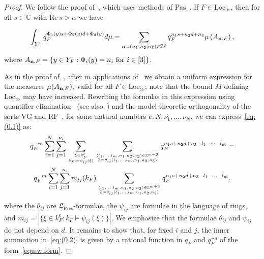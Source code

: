\documentclass[11pt,a4paper]{amsart}
\theoremstyle{plain}
\theoremstyle{remark}
\newcommand{\Z}{\mathbb{Z}}
\def \bfn {{\bf n}}
\begin{document}
\begin{proof}
We follow the proof of~\cite[Theorem~B]{BDOP/11}, which uses methods
of Pas~\cite{Pas/89}. If $F\in\mathrm{Loc}_{\gg}$, then for all $s\in\mathbb{C}$
with $\mathrm{Re} \, s> \alpha$ we have

\begin{equation} \label{eq:(0.1)}
\int_{Y_{F}}q_{F}^{\Phi_{1}(y)s+\Phi_{2}(y)d+\Phi_{3}(y)}d\mu=\sum_{\bfn = (n_{1},n_{2},n_{3}) \in \mathbb{Z}^{3}} q_{F}^{n_{1}s+n_{2}d+n_{3}}\mu\left(A_{\bfn,F}\right),
\end{equation}
where 
$A_{\bfn,F}=\{y \in Y_{F}:\Phi_{i}(y)=n_{i}\text{ for }i \in [3] \}$.

As in the proof of~\cite[Theorem~B]{BDOP/11}, after $m$ applications
of~\cite[Theorem~4.1]{BDOP/11} we obtain a uniform expression for
the measures $\mu(A_{\bfn,F})$, valid for all $F\in\mathrm{Loc}_{\gg}$; note that the bound $M$ defining $\mathrm{Loc}_\gg$ may have increased.
Rewriting the formulas in this expression using quantifier elimination~\cite[Theorem~4.1]{Pas/89} (see also~\cite[Theorem~3.7]{BDOP/11})
and the model-theoretic orthogonality of the sorts $\mathrm{VG}$
and $\mathrm{RF}$~\cite[Lemma 5.3]{Pas/89},
for some natural numbers $e,N,\nu_{1},...,\nu_{N}$, we can express~\eqref{eq:(0.1)}
as:
\begin{multline} \label{eq:(0.2)}
q_F^{-m} \sum_{i = 1}^N \sum_{j = 1}^{\nu_i} \sum_{\xi \in k_F^e \atop k_F \models \psi_{ij}(\xi)} \sum_{(l_1, \dots, l_m, n_1, n_2, n_3) \in \Z^{m+3} \atop \Z \models \theta_{ij}(l_1, \dots, l_m, n_1, n_2, n_3)} q_F^{n_1 s + n_2 d + n_3 - l_1 - \cdots - l_m} = \\
q_{F}^{-m}\sum_{i=1}^{N}\sum_{j=1}^{\nu_{i}}m_{ij}(k_{F})\sum_{
(l_{1},...,l_{m},n_{1},n_{2},n_{3}) \in\mathbb{Z}^{m+3} \atop
\mathbb{Z}\models\theta_{ij}(l_{1},...,l_{m},n_{1},n_{2},n_{3})
}q_{F}^{n_{1}s+n_{2}d+n_{3}-l_{1}-...-l_{m}},
\end{multline}
where the $\theta_{ij}$ are $\mathfrak{L}_{\mathrm{Pres}}$-formulae, the $\psi_{ij}$ are formulae in the language of rings, 
and $m_{ij}= | \{\xi\in k_{F}^{e}:k_{F} \models \psi_{ij}(\xi)\} |$.  We emphasize that the formulae $\theta_{ij}$ and $\psi_{ij}$ do not depend on $d$.
It remains to show that, for fixed $i$ and $j$, the inner summation in~\eqref{eq:(0.2)}
is given by a rational function in $q_{F}$ and $q_{F}^{-s}$ of the form~\eqref{equ:w.form}.


\end{proof}
\end{document}
